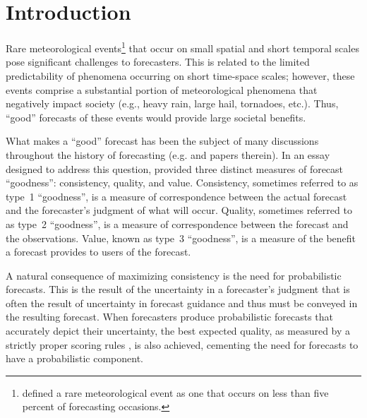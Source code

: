 

\chapter{Introduction}
\label{intro}

Rare meteorological events\footnote{\cite{Murphy1991} defined a rare meteorological event as one that occurs on less than five percent of forecasting occasions.} that occur on small spatial and short temporal scales pose significant challenges to forecasters.
This is related to the limited predictability of phenomena occurring on short time-space scales; however, these events comprise a substantial portion of meteorological phenomena that negatively impact society (e.g., heavy rain, large hail, tornadoes, etc.).
Thus, ``good'' forecasts of these events would provide large societal benefits.


What makes a ``good'' forecast has been the subject of many discussions throughout the history of forecasting (e.g. \citealp{Peirce1884, Clayton1889, Nichols1890, Mascart1922, Winkler1968, Murphy1993, Murphy1996} and papers therein).
In an essay designed to address this question, \cite{Murphy1993} provided three distinct measures of forecast ``goodness'': consistency, quality, and value.
Consistency, sometimes referred to as \mbox{type 1} ``goodness'', is a measure of correspondence between the actual forecast and the forecaster's judgment of what will occur.
Quality, sometimes referred to as \mbox{type 2} ``goodness'', is a measure of correspondence between the forecast and the observations.
Value, known as \mbox{type 3} ``goodness'', is a measure of the benefit a forecast provides to users of the forecast.


A natural consequence of maximizing consistency is the need for probabilistic forecasts.
This is the result of the uncertainty in a forecaster's judgment that is often the result of uncertainty in forecast guidance and thus must be conveyed in the resulting forecast.
When forecasters produce probabilistic forecasts that accurately depict their uncertainty, the best expected quality, as measured by a strictly proper scoring rules \citep{Winkler1968}, is also achieved, cementing the need for forecasts to have a probabilistic component.


